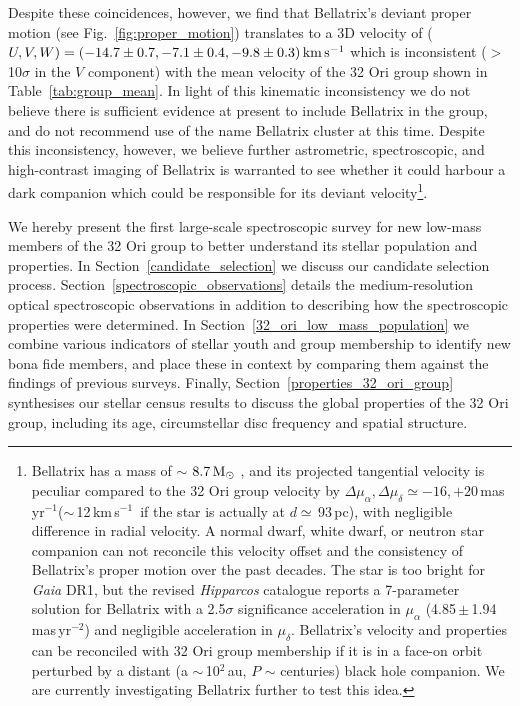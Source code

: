 \documentclass[usenatbib]{mnras}
\newcommand{\masyr}{mas\,yr$^{-1}$}
\newcommand{\kms}{\textrm{km\,s$^{-1}$}}
\begin{document}
\noindent Despite these coincidences, however, we find that Bellatrix's deviant
proper motion (see Fig.~\ref{fig:proper_motion}) translates to a 3D
velocity of ($U, V, W) = (-14.7\pm0.7, -7.1\pm0.4,
-9.8\pm0.3)\,\rm{km\,s^{-1}}$ which is inconsistent ($>$10$\sigma$
in the $V$ component) with the mean velocity of the 32 Ori group shown
in Table~\ref{tab:group_mean}. In light of this kinematic
inconsistency we do not believe there is sufficient evidence at present
to include Bellatrix in the group, and do not recommend use of
the name Bellatrix cluster at this time. Despite this inconsistency, however,
we believe further
astrometric, spectroscopic, and high-contrast imaging of Bellatrix is warranted to see whether it could harbour a dark companion which
could be responsible for its deviant velocity\footnote{Bellatrix has a mass of $\sim$ $8.7\,\rm{M_{\odot}}$
  \citep*{Hohle10}, and its projected tangential velocity is peculiar
  compared to the 32 Ori group velocity by $\Delta \mu_{\alpha},
  \Delta \mu_{\delta} \simeq -16, +20 $\,\masyr ($\sim$\,12\,\kms\, if
  the star is actually at $d \simeq$\,93\,pc), with negligible
  difference in radial velocity. A normal dwarf, white dwarf, or neutron star companion can not
reconcile this velocity offset and the consistency of Bellatrix's
proper motion over the past decades. The star is too bright for \emph{Gaia} DR1, but the revised \emph{Hipparcos} catalogue
\citep{vanLeeuwen07} reports a 7-parameter solution for Bellatrix with a
2.5$\sigma$ significance acceleration in $\mu_{\alpha}$
(4.85\,$\pm$\,1.94 mas\,yr$^{-2}$) and negligible acceleration in
$\mu_{\delta}$. Bellatrix's velocity and properties can be reconciled
with 32 Ori group membership if it is in a face-on orbit perturbed by
a distant (a $\sim$\,10$^2$\,au, $P$ $\sim$ centuries) black hole
companion. We are currently investigating Bellatrix further to test
this idea.}.

We hereby
present the first large-scale spectroscopic survey for new low-mass
members of the 32 Ori group to better understand its stellar
population and properties. In Section~\ref{candidate_selection} we
discuss our candidate selection
process. Section~\ref{spectroscopic_observations} details the
medium-resolution optical spectroscopic observations in addition to
describing how the spectroscopic properties were determined. In
Section~\ref{32_ori_low_mass_population} we combine various indicators
of stellar youth and group membership to identify new bona fide
members, and place these in context by comparing them against the
findings of previous surveys. Finally,
Section~\ref{properties_32_ori_group} synthesises our stellar census
results to discuss the global properties of the 32 Ori group,
including its age, circumstellar disc frequency and spatial structure.
\end{document}
